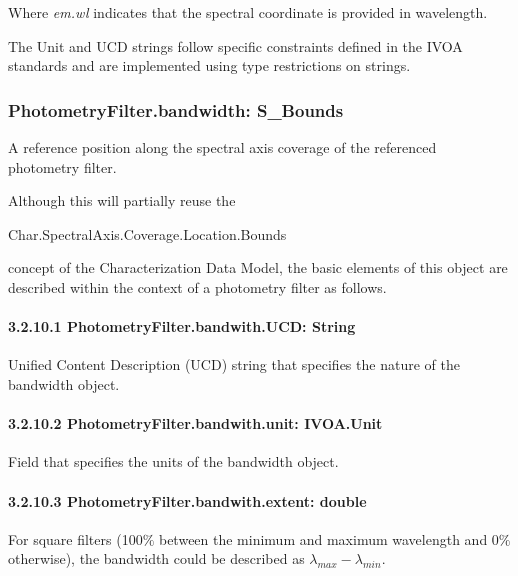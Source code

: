 \documentclass[11pt,a4paper]{ivoa}
\begin{document}

Where \textit{em.wl }indicates that the spectral coordinate is provided in wavelength.
\par

The Unit and UCD strings follow specific constraints defined in the IVOA standards and are implemented using type restrictions on strings.
\par

\subsubsection{PhotometryFilter.bandwidth: S\_Bounds}
A reference position along the spectral axis coverage of the referenced photometry filter. 
\par

Although this will partially reuse the 
\par

\begin{center}
Char.SpectralAxis.Coverage.Location.Bounds
\end{center}\par

concept of the Characterization Data Model, the basic elements of this object are described within the context of a photometry filter as follows.
\par

\paragraph{3.2.10.1
PhotometryFilter.bandwith.UCD: String}
Unified Content Description (UCD) string that specifies the nature of the bandwidth object.
\par

\paragraph{3.2.10.2
PhotometryFilter.bandwith.unit: IVOA.Unit}
Field that specifies the units of the bandwidth object.
\par

\paragraph{3.2.10.3
PhotometryFilter.bandwith.extent: double}
For square filters (100$\%$  between the minimum and maximum wavelength and 0$\%$  otherwise), the bandwidth could be described as $\lambda_{max} - \lambda_{min}$. 
\par
\end{document}

